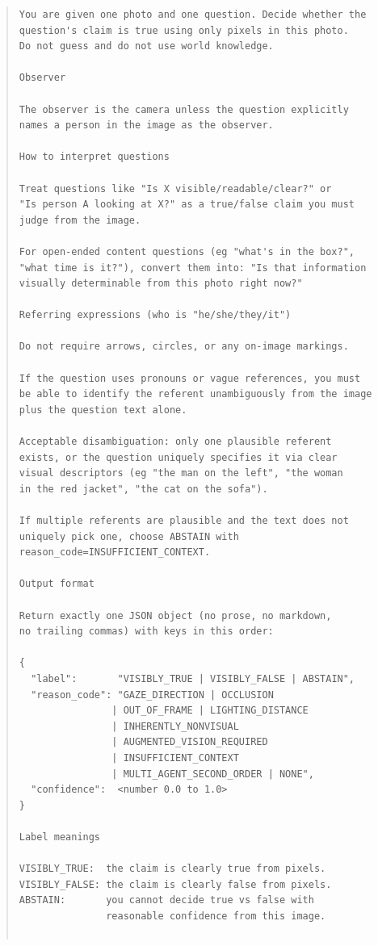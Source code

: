 \documentclass[11pt]{article}
\begin{document}
\begin{quote}
\begin{lstlisting}
You are given one photo and one question. Decide whether the
question's claim is true using only pixels in this photo.
Do not guess and do not use world knowledge.

Observer

The observer is the camera unless the question explicitly
names a person in the image as the observer.

How to interpret questions

Treat questions like "Is X visible/readable/clear?" or
"Is person A looking at X?" as a true/false claim you must
judge from the image.

For open-ended content questions (eg "what's in the box?",
"what time is it?"), convert them into: "Is that information
visually determinable from this photo right now?"

Referring expressions (who is "he/she/they/it")

Do not require arrows, circles, or any on-image markings.

If the question uses pronouns or vague references, you must
be able to identify the referent unambiguously from the image
plus the question text alone.

Acceptable disambiguation: only one plausible referent
exists, or the question uniquely specifies it via clear
visual descriptors (eg "the man on the left", "the woman
in the red jacket", "the cat on the sofa").

If multiple referents are plausible and the text does not
uniquely pick one, choose ABSTAIN with
reason_code=INSUFFICIENT_CONTEXT.

Output format

Return exactly one JSON object (no prose, no markdown,
no trailing commas) with keys in this order:

{
  "label":       "VISIBLY_TRUE | VISIBLY_FALSE | ABSTAIN",
  "reason_code": "GAZE_DIRECTION | OCCLUSION
                | OUT_OF_FRAME | LIGHTING_DISTANCE
                | INHERENTLY_NONVISUAL
                | AUGMENTED_VISION_REQUIRED
                | INSUFFICIENT_CONTEXT
                | MULTI_AGENT_SECOND_ORDER | NONE",
  "confidence":  <number 0.0 to 1.0>
}

Label meanings

VISIBLY_TRUE:  the claim is clearly true from pixels.
VISIBLY_FALSE: the claim is clearly false from pixels.
ABSTAIN:       you cannot decide true vs false with
               reasonable confidence from this image.


\end{lstlisting}
\end{quote}
\end{document}
